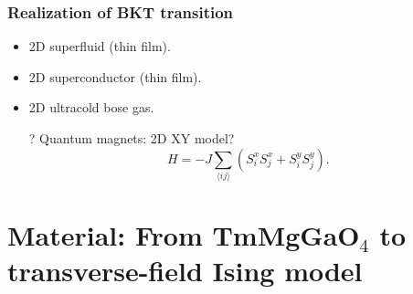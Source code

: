 \documentclass[xcolor=table, aspectratio=1610,ignorenonframetext]{beamer}
\begin{document}
\begin{frame}
  \frametitle{Realization of BKT transition}
  \begin{itemize}
  \item 2D superfluid (thin film).
  \item 2D superconductor (thin film).
  \item 2D ultracold bose gas.
  \item[?] Quantum magnets: 2D XY model?
    \[H=-J\sum_{\langle ij\rangle}\left(S_i^xS_j^x + S_i^yS_j^y\right).\]  
  \end{itemize}
\end{frame}

\section{Material: From TmMgGaO${}_4$ to transverse-field Ising model}
\end{document}
